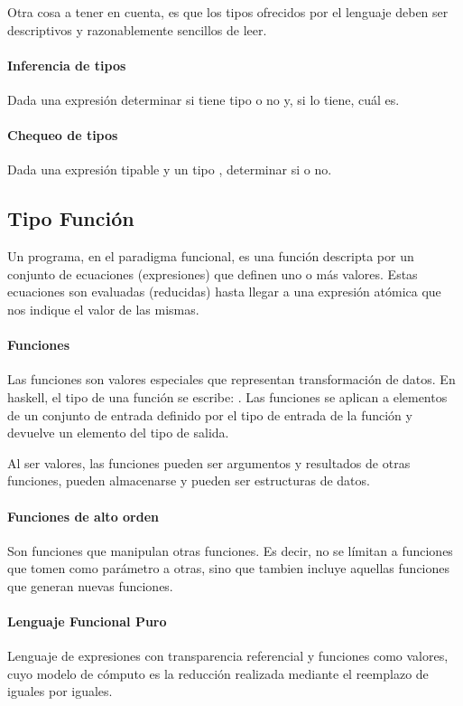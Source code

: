 Otra cosa a tener en cuenta, es que los tipos ofrecidos por el lenguaje deben ser descriptivos y razonablemente sencillos de leer.

\paragraph{Inferencia de tipos} Dada una expresión  determinar si tiene tipo o no y, si lo tiene, cuál es.

\paragraph{Chequeo de tipos} Dada una expresión tipable  y un tipo , determinar si  o no.

\subsection{Tipo Función}
Un programa, en el paradigma funcional, es una función descripta por un conjunto de ecuaciones (expresiones) que definen uno o más valores. Estas ecuaciones son evaluadas (reducidas) hasta llegar a una expresión atómica que nos indique el valor de las mismas.

\paragraph{Funciones} Las funciones son valores especiales que representan transformación de datos. En haskell, el tipo de una función se escribe: \haskell{->}. Las funciones se aplican a elementos de un conjunto de entrada definido por el tipo de entrada de la función y devuelve un elemento del tipo de salida.

Al ser valores, las funciones pueden ser argumentos y resultados de otras funciones, pueden almacenarse y pueden ser estructuras de datos.

\paragraph{Funciones de alto orden} Son funciones que manipulan otras funciones. Es decir, no se límitan a funciones que tomen como parámetro a otras, sino que tambien incluye aquellas funciones que generan nuevas funciones.

\paragraph{Lenguaje Funcional Puro} Lenguaje de expresiones con transparencia referencial y funciones como valores, cuyo modelo de cómputo es la reducción realizada mediante el reemplazo de iguales por iguales.

